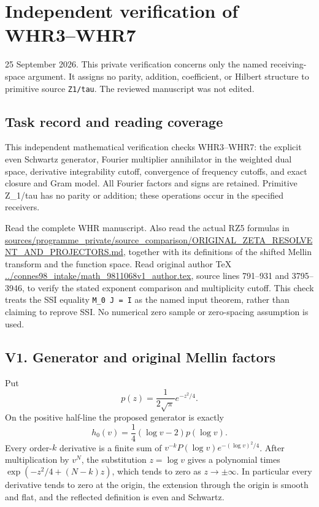 \section{Independent verification of
WHR3--WHR7}\label{independent-verification-of-whr3whr7}

25 September 2026. This private verification concerns only the named
receiving-space argument. It assigns no parity, addition, coefficient,
or Hilbert structure to primitive source \texttt{Z1/tau}. The reviewed
manuscript was not edited.

\subsection{Task record and reading
coverage}\label{task-record-and-reading-coverage}

This independent mathematical verification checks WHR3--WHR7: the
explicit even Schwartz generator, Fourier multiplier annihilator in the
weighted dual space, derivative integrability cutoff, convergence of
frequency cutoffs, and exact closure and Gram model. All Fourier factors
and signs are retained. Primitive Z\_1/tau has no parity or addition;
these operations occur in the specified receivers.

Read the complete WHR manuscript. Also read the actual RZ5 formulas in
\href{https://github.com/KokunoYumeto/zeta-function-research-reader/blob/36a82ecca98addb8a98b48204e349737856c7223/workbenches/splitzero-tandem/continuations/20260924-cohomology-weight-and-character-lifts/gct-weight-control/proofs/ORIGINAL_ZETA_RESOLVENT_AND_PROJECTORS.md}{sources/programme\_private/source\_comparison/ORIGINAL\_ZETA\_RESOLVENT\_AND\_PROJECTORS.md},
together with its definitions of the shifted Mellin transform and the
function space. Read original author TeX
\href{https://arxiv.org/abs/math/9811068v1}{../connes98\_intake/math\_9811068v1\_author.tex},
source lines 791--931 and 3795--3946, to verify the stated exponent
comparison and multiplicity cutoff. This check treats the SSI equality
\texttt{M\_0\ J\ =\ I} as the named input theorem, rather than claiming
to reprove SSI. No numerical zero sample or zero-spacing assumption is
used.

\subsection{V1. Generator and original Mellin
factors}\label{v1.-generator-and-original-mellin-factors}

Put \[
p(z)=\frac1{2\sqrt\pi}e^{-z^2/4}.
\] On the positive half-line the proposed generator is exactly \[
h_0(v)=\frac14(\log v-2)p(\log v).
\] Every order-\(k\) derivative is a finite sum of
\(v^{-k}P(\log v)e^{-(\log v)^2/4}\). After multiplication by \(v^N\),
the substitution \(z=\log v\) gives a polynomial times
\(\exp(-z^2/4+(N-k)z)\), which tends to zero as \(z\to\pm\infty\). In
particular every derivative tends to zero at the origin, the extension
through the origin is smooth and flat, and the reflected definition is
even and Schwartz.

